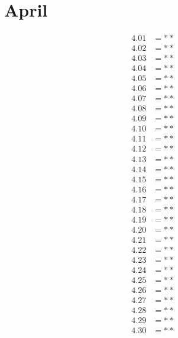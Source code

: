 \documentclass[12pt]{article}
\begin{document}
\pagebreak

\section{April}
\begin{align*}
4.01 &= **\\
4.02 &= **\\
4.03 &= **\\
4.04 &= **\\
4.05 &= **\\
4.06 &= **\\
4.07 &= **\\
4.08 &= **\\
4.09 &= **\\
4.10 &= **\\
4.11 &= **\\
4.12 &= **\\
4.13 &= **\\
4.14 &= **\\
4.15 &= **\\
4.16 &= **\\
4.17 &= **\\
4.18 &= **\\
4.19 &= **\\
4.20 &= **\\
4.21 &= **\\
4.22 &= **\\
4.23 &= **\\
4.24 &= **\\
4.25 &= **\\
4.26 &= **\\
4.27 &= **\\
4.28 &= **\\
4.29 &= **\\
4.30 &= **\\
\end{align*}

\pagebreak
\end{document}
